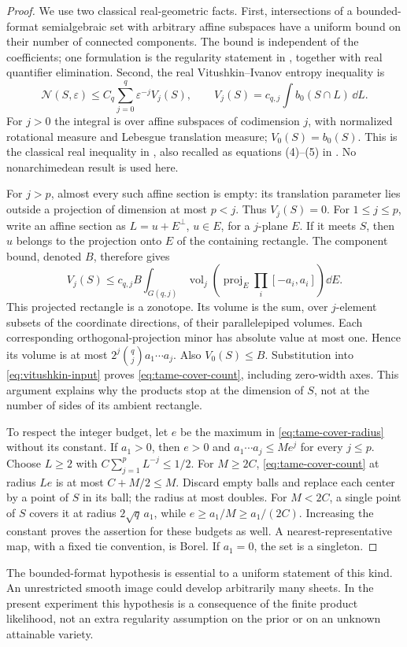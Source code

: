 \begin{proof}
We use two classical real-geometric facts. First, intersections of a
bounded-format semialgebraic set with arbitrary affine subspaces have a
uniform bound on their number of connected components. The bound is
independent of the coefficients; one formulation is the regularity
statement in \cite[Lemma 2.18]{ZhangKileel}, together with real quantifier
elimination. Second, the real Vitushkin--Ivanov entropy inequality is
\begin{equation}\label{eq:vitushkin-input}
 \mathcal N(S,\varepsilon)\le C_q\sum_{j=0}^q
       \varepsilon^{-j}V_j(S),\qquad
 V_j(S)=c_{q,j}\int b_0(S\cap L)\,\dd L.
\end{equation}
For $j>0$ the integral is over affine subspaces of codimension $j$,
with normalized rotational measure and Lebesgue translation measure;
$V_0(S)=b_0(S)$. This is the classical real inequality in
\cite[Theorem 3.5]{YomdinComte}, also recalled as equations (4)--(5)
in \cite{ComteHalupczok}. No nonarchimedean result is used here.

For $j>p$, almost every such affine section is empty: its translation
parameter lies outside a projection of dimension at most $p<j$.
Thus $V_j(S)=0$. For $1\le j\le p$, write an affine section as
$L=u+E^\perp$, $u\in E$, for a $j$-plane $E$. If it meets $S$,
then $u$ belongs to the projection onto $E$ of the containing rectangle.
The component bound, denoted $B$, therefore gives
\[
 V_j(S)\le c_{q,j}B
      \int_{G(q,j)}\operatorname{vol}_j
       \left(\operatorname{proj}_E\prod_i[-a_i,a_i]\right)\dd E.
\]
This projected rectangle is a zonotope. Its volume is the sum, over
$j$-element subsets of the coordinate directions, of their parallelepiped
volumes. Each corresponding orthogonal-projection minor has absolute
value at most one. Hence its volume is at most
$2^j\binom qj a_1\cdots a_j$. Also $V_0(S)\le B$.
Substitution into \eqref{eq:vitushkin-input} proves
\eqref{eq:tame-cover-count}, including zero-width axes. This argument
explains why the products stop at the dimension of $S$, not at the
number of sides of its ambient rectangle.

To respect the integer budget, let $e$ be the maximum in
\eqref{eq:tame-cover-radius} without its constant. If $a_1>0$, then
$e>0$ and $a_1\cdots a_j\le Me^j$ for every $j\le p$.
Choose $L\ge2$ with $C\sum_{j=1}^p L^{-j}\le1/2$. For
$M\ge2C$, \eqref{eq:tame-cover-count} at radius $Le$ is at most
$C+M/2\le M$. Discard empty balls and replace each center by a point
of $S$ in its ball; the radius at most doubles. For $M<2C$, a single
point of $S$ covers it at radius $2\sqrt q\,a_1$, while
$e\ge a_1/M\ge a_1/(2C)$. Increasing the constant proves the assertion
for these budgets as well. A nearest-representative map, with a fixed
tie convention, is Borel. If $a_1=0$, the set is a singleton.
\end{proof}

The bounded-format hypothesis is essential to a uniform statement of
this kind. An unrestricted smooth image could develop arbitrarily many
sheets. In the present experiment this hypothesis is a consequence of
the finite product likelihood, not an extra regularity assumption on the
prior or on an unknown attainable variety.

